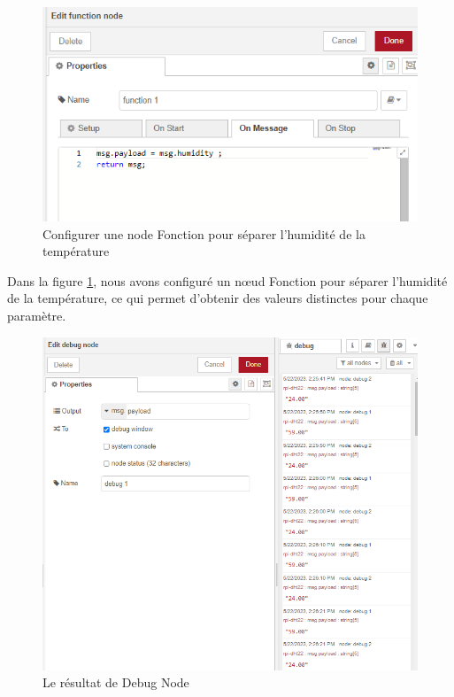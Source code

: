 \begin{figure}[H]
\centering
\includegraphics[width=15cm]{Images/Node-9.png}
\caption{Configurer une node Fonction pour séparer l'humidité de la température}
\label{Chap4.3.16}
\end{figure}

Dans la figure \ref{Chap4.3.16}, nous avons configuré un nœud Fonction pour séparer l'humidité de la température, ce qui permet d'obtenir des valeurs distinctes pour chaque paramètre.

\begin{figure}[H]
\centering
\includegraphics[width=15cm]{Images/Node-10.png}
\caption{Le résultat de Debug Node}
\label{Chap4.3.17}
\end{figure}

